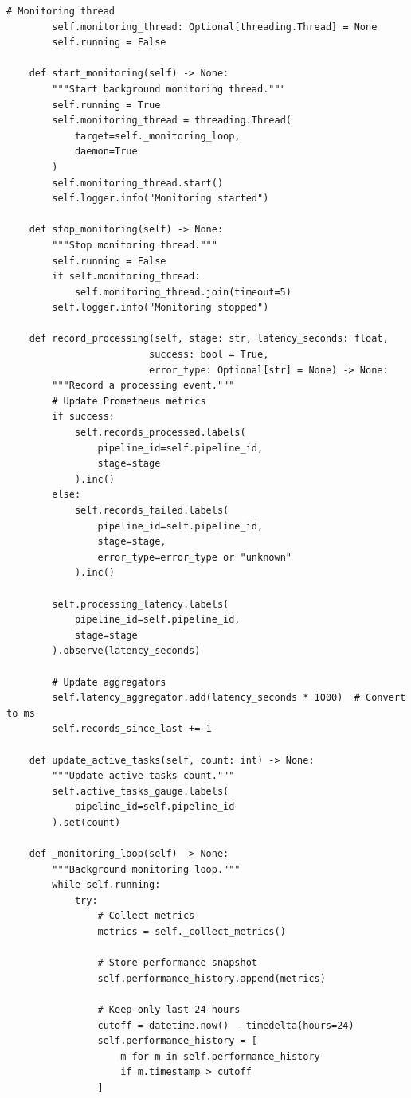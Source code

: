 \begin{lstlisting}[style=python, caption=PipelineMonitor with Performance Tracking]
        # Monitoring thread
        self.monitoring_thread: Optional[threading.Thread] = None
        self.running = False

    def start_monitoring(self) -> None:
        """Start background monitoring thread."""
        self.running = True
        self.monitoring_thread = threading.Thread(
            target=self._monitoring_loop,
            daemon=True
        )
        self.monitoring_thread.start()
        self.logger.info("Monitoring started")

    def stop_monitoring(self) -> None:
        """Stop monitoring thread."""
        self.running = False
        if self.monitoring_thread:
            self.monitoring_thread.join(timeout=5)
        self.logger.info("Monitoring stopped")

    def record_processing(self, stage: str, latency_seconds: float,
                         success: bool = True,
                         error_type: Optional[str] = None) -> None:
        """Record a processing event."""
        # Update Prometheus metrics
        if success:
            self.records_processed.labels(
                pipeline_id=self.pipeline_id,
                stage=stage
            ).inc()
        else:
            self.records_failed.labels(
                pipeline_id=self.pipeline_id,
                stage=stage,
                error_type=error_type or "unknown"
            ).inc()

        self.processing_latency.labels(
            pipeline_id=self.pipeline_id,
            stage=stage
        ).observe(latency_seconds)

        # Update aggregators
        self.latency_aggregator.add(latency_seconds * 1000)  # Convert to ms
        self.records_since_last += 1

    def update_active_tasks(self, count: int) -> None:
        """Update active tasks count."""
        self.active_tasks_gauge.labels(
            pipeline_id=self.pipeline_id
        ).set(count)

    def _monitoring_loop(self) -> None:
        """Background monitoring loop."""
        while self.running:
            try:
                # Collect metrics
                metrics = self._collect_metrics()

                # Store performance snapshot
                self.performance_history.append(metrics)

                # Keep only last 24 hours
                cutoff = datetime.now() - timedelta(hours=24)
                self.performance_history = [
                    m for m in self.performance_history
                    if m.timestamp > cutoff
                ]


\end{lstlisting}
